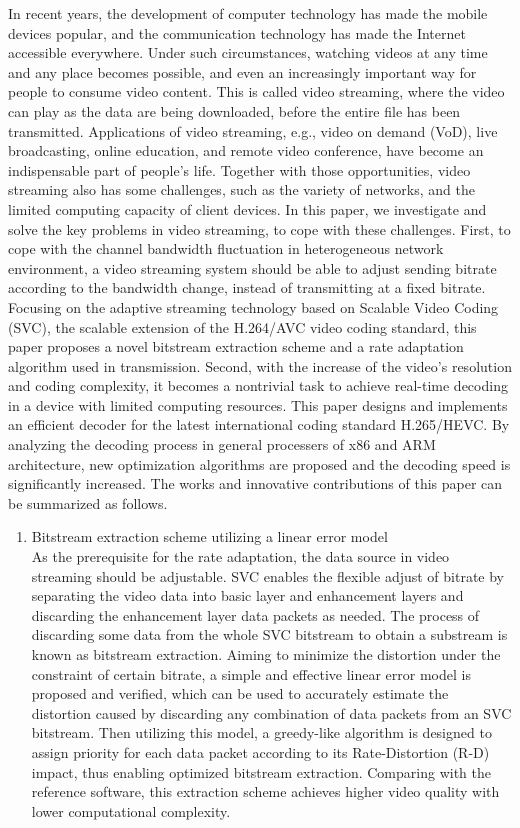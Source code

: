 \begin{eabstract}
In recent years, the development of computer technology has made the mobile devices popular, and the communication technology has made the Internet accessible everywhere. Under such circumstances, watching videos at any time and any place becomes possible, and even an increasingly important way for people to consume video content. This is called video streaming, where the video can play as the data are being downloaded, before the entire file has been transmitted. Applications of video streaming, e.g., video on demand (VoD), live broadcasting, online education, and remote video conference, have become an indispensable part of people's life. Together with those opportunities, video streaming also has some challenges, such as the variety of networks, and the limited computing capacity of client devices. In this paper, we investigate and solve the key problems in video streaming, to cope with these challenges. First, to cope with the channel bandwidth fluctuation in heterogeneous network environment, a video streaming system should be able to adjust sending bitrate according to the bandwidth change, instead of transmitting at a fixed bitrate. Focusing on the adaptive streaming technology based on Scalable Video Coding (SVC), the scalable extension of the H.264/AVC video coding standard, this paper proposes a novel bitstream extraction scheme and a rate adaptation algorithm used in transmission. Second, with the increase of the video's resolution and coding complexity, it becomes a nontrivial task to achieve real-time decoding in a device with limited computing resources. This paper designs and implements an efficient decoder for the latest international coding standard H.265/HEVC. By analyzing the decoding process in general processers of x86 and ARM architecture, new optimization algorithms are proposed and the decoding speed is significantly increased. The works and innovative contributions of this paper can be summarized as follows.
\begin{enumerate}
\item {Bitstream extraction scheme utilizing a linear error model}\\
As the prerequisite for the rate adaptation, the data source in video streaming should be adjustable. SVC enables the flexible adjust of bitrate by separating the video data into basic layer and enhancement layers and discarding the enhancement layer data packets as needed. The process of discarding some data from the whole SVC bitstream to obtain a substream is known as bitstream extraction. Aiming to minimize the distortion under the constraint of certain bitrate, a simple and effective linear error model is proposed and verified, which can be used to accurately estimate the distortion caused by discarding any combination of data packets from an SVC bitstream. Then utilizing this model, a greedy-like algorithm is designed to assign priority for each data packet according to its Rate-Distortion (R-D) impact, thus enabling optimized bitstream extraction. Comparing with the reference software, this extraction scheme achieves higher video quality with lower computational complexity.

\end{enumerate}
\end{eabstract}
